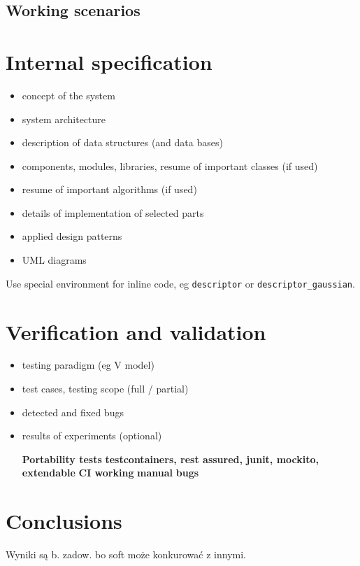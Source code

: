 \documentclass[a4paper,twoside,12pt]{book}
\begin{document}
\section{Working scenarios}


\chapter{Internal specification}

\begin{itemize}
\item concept of the system
\item system architecture
\item description of data structures (and data bases)
\item components, modules, libraries, resume of important classes (if used)
\item resume of important algorithms (if used)
\item details of implementation of selected parts
\item applied design patterns
\item UML diagrams
\end{itemize}

Use special environment for inline code, eg \lstinline|descriptor| or \lstinline|descriptor_gaussian|.




\chapter{Verification and validation}
\begin{itemize}
\item testing paradigm (eg V model)
\item test cases, testing scope (full / partial)
\item detected and fixed bugs
\item results of experiments (optional)

\textbf{Portability tests}
\textbf{testcontainers, rest assured, junit, mockito, extendable}
\textbf{CI working}
\textbf{manual}
\textbf{bugs}
\end{itemize}

 
 

\chapter{Conclusions}

Wyniki są b. zadow. bo soft może konkurować z innymi.
\end{document}

